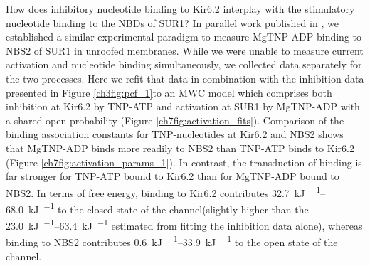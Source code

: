How does inhibitory nucleotide binding to Kir6.2 interplay with the stimulatory nucleotide binding to the NBDs of SUR1?
In parallel work published in \textcite{puljung_activation_2019}, we established a similar experimental paradigm to measure MgTNP-ADP binding to NBS2 of SUR1 in unroofed membranes.
While we were unable to measure current activation and nucleotide binding simultaneously, we collected data separately for the two processes.
Here we refit that data in combination with the inhibition data presented in Figure \ref{ch3fig:pcf_1}to an MWC model which comprises both inhibition at Kir6.2 by TNP-ATP and activation at SUR1 by MgTNP-ADP with a shared open probability (Figure \ref{ch7fig:activation_fits}).
Comparison of the binding association constants for TNP-nucleotides at Kir6.2 and NBS2 shows that MgTNP-ADP binds more readily to NBS2 than TNP-ATP binds to Kir6.2 (Figure \ref{ch7fig:activation_params_1}).
In contrast, the transduction of binding is far stronger for TNP-ATP bound to Kir6.2 than for MgTNP-ADP bound to NBS2.
In terms of free energy, binding to Kir6.2 contributes \SIrange{32.7}{68.0}{\kilo\joule\per\Molar} to the closed state of the channel(slightly higher than the \SIrange{23.0}{63.4}{\kilo\joule\per\Molar} estimated from fitting the inhibition data alone), whereas binding to NBS2 contributes \SIrange{0.6}{33.9}{\kilo\joule\per\Molar} to the open state of the channel.


